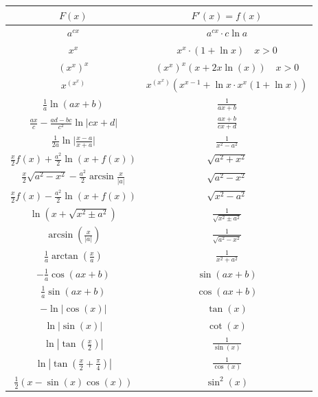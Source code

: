 \documentclass[a4paper,8pt]{extarticle}
\begin{document}
\begin{center}
        \begin{tabular}{c||c}
                $F(x)$ & $F'(x) = f(x)$ \\
                \hline \hline

	       
                $ a^{cx} $ & $ a^{cx} \cdot c \ln a $ \\
                $ x^x $ & $ x^x \cdot (1+\ln x) \quad \scriptstyle x > 0 $ \\
                $ (x^x)^x $ & $ (x^x)^x(x+2x\ln(x)) \quad \scriptstyle x > 0 $ \\
                $ x^{(x^x)} $ & $ x^{(x^x)}(x^{x-1}+\ln x \cdot x^x (1+\ln x)) $ \\
                $ \frac{1}{a} \ln (ax+b) $  &  $ \frac{1}{ax+b}$ \\
                $ \frac{ax}{c}-\frac{ad-bc}{c^2} \ln |cx+d| $  &  $ \frac{ax+b}{cx+d} $ \\
                $ \frac{1}{2a} \ln { \big| \frac{x-a}{x+a} \big| } $  &  $ \frac{1}{x^2-a^2} $ \\
                $ \frac{x}{2} f(x) + \frac{a^2}{2} \ln ( x+f(x) ) $  &  $ \sqrt{a^2+x^2} $ \\
                $ \frac{x}{2} \sqrt{a^2-x^2} - \frac{a^2}{2} \arcsin \frac{x}{|a|} $  &  $ \sqrt{a^2-x^2} $ \\
                $ \frac{x}{2} f(x) - \frac{a^2}{2} \ln {( x+f(x) )} $  &  $ \sqrt{x^2-a^2} $ \\
                $ \ln(x+\sqrt{x^2 \pm a^2}) $  &  $ \frac{1}{\sqrt{x^2 \pm  a^2}} $ \\
                $ \arcsin( \frac{x}{|a|}) $  &  $ \frac{1}{\sqrt{a^2-x^2}} $ \\
                $ \frac{1}{a} \arctan(\frac{x}{a}) $  &  $ \frac{1}{x^2+a^2} $ \\
                $ -\frac{1}{a}\cos(ax+b) $  &  $ \sin(ax+b) $ \\
                $ \frac{1}{a}\sin(ax+b) $  &  $ \cos(ax+b) $ \\
                $ -\ln|\cos(x)| $  &  $ \tan(x) $ \\
                $ \ln |\sin(x)| $  &  $ \cot(x) $ \\
                $ \ln \left|\tan(\frac{x}{2})\right| $  &  $ \frac{1}{\sin(x)} $ \\
                $ \ln \left|\tan(\frac{x}{2}+\frac{\pi}{4})\right| $  &  $ \frac{1}{\cos(x)} $ \\
                $ \frac{1}{2} (x-\sin(x)\cos(x)) $  &  $ \sin^2(x) $ \\

\end{tabular}
\end{center}
\end{document}
